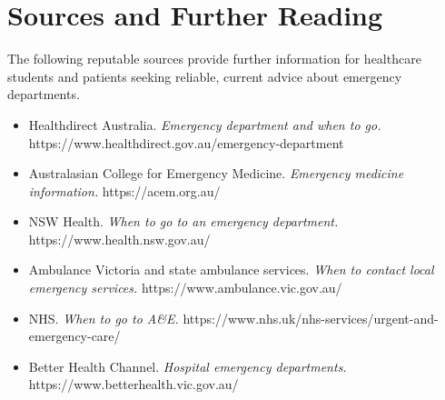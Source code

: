 \section*{Sources and Further Reading}
The following reputable sources provide further information for healthcare students and patients seeking reliable, current advice about emergency departments.
\begin{itemize}
    \item Healthdirect Australia. \textit{Emergency department and when to go.} https://www.healthdirect.gov.au/emergency-department
    \item Australasian College for Emergency Medicine. \textit{Emergency medicine information.} https://acem.org.au/
    \item NSW Health. \textit{When to go to an emergency department.} https://www.health.nsw.gov.au/
    \item Ambulance Victoria and state ambulance services. \textit{When to contact local emergency services.} https://www.ambulance.vic.gov.au/
    \item NHS. \textit{When to go to A\&E.} https://www.nhs.uk/nhs-services/urgent-and-emergency-care/
    \item Better Health Channel. \textit{Hospital emergency departments.} https://www.betterhealth.vic.gov.au/
\end{itemize}
